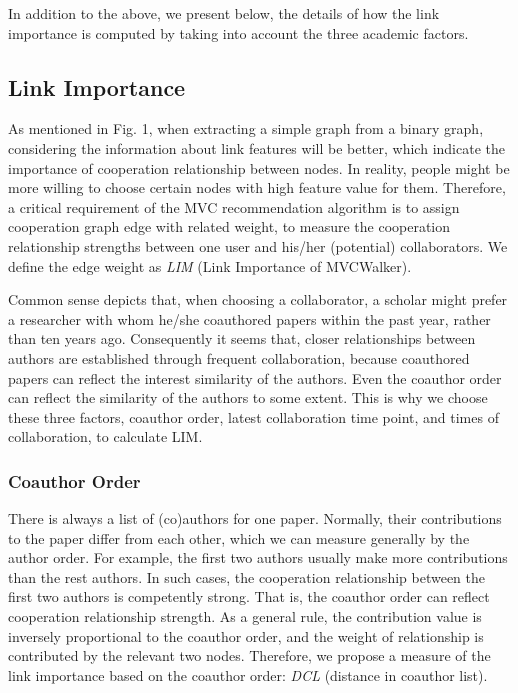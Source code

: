 \documentclass[10pt,journal,compsoc]{IEEEtran}
\begin{document}
In addition to the above, we present below, the details of how the link importance is computed by taking into account the three academic factors.

\subsection{Link Importance}
As mentioned in Fig. 1, when extracting a simple graph from a binary graph, considering the information about link features will be better, which indicate the importance of cooperation relationship between nodes. In reality, people might be more willing to choose certain nodes with high feature value for them. Therefore, a critical requirement of the MVC recommendation algorithm is to assign cooperation graph edge with related weight, to measure the cooperation relationship strengths between one user and his/her (potential) collaborators. We define the edge weight as \emph{LIM} (Link Importance of MVCWalker).

Common sense depicts that, when choosing a collaborator, a scholar might prefer a researcher with whom he/she coauthored papers within the past year, rather than ten years ago. Consequently it seems that, closer relationships between authors are established through frequent collaboration, because coauthored papers can reflect the interest similarity of the authors. Even the coauthor order can reflect the similarity of the authors to some extent. This is why we choose these three factors, coauthor order, latest collaboration time point, and times of collaboration, to calculate LIM.

\subsubsection{Coauthor Order}
There is always a list of (co)authors for one paper. Normally, their contributions to the paper differ from each other, which we can measure generally by the author order. For example, the first two authors usually make more contributions than the rest authors. In such cases, the cooperation relationship between the first two authors is competently strong. That is, the coauthor order can reflect cooperation relationship strength. As a general rule, the contribution value is inversely proportional to the coauthor order, and the weight of relationship is contributed by the relevant two nodes. Therefore, we propose a measure of the link importance based on the coauthor order: \emph{DCL} (distance in coauthor list).
\end{document}
